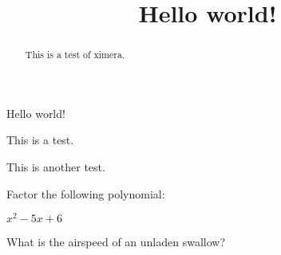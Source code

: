 \documentclass{ximera}
\begin{document}
\title{Hello world!}

\begin{abstract}
This is a test of ximera.
\end{abstract}

\maketitle

Hello world!

This is a test.

This is another test.

\begin{exercise}
Factor the following polynomial:

$x^2 - 5x + 6$ 
\end{exercise}

\begin{exercise}
What is the airspeed of an unladen swallow? 
\end{exercise}
\end{document}
